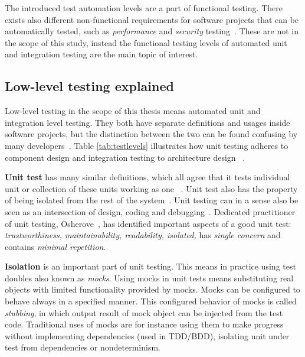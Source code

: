     The introduced test automation levels are a part of functional testing. There exists also different non-functional
    requirements for software projects that can be automatically tested, such as \textit{performance} and \textit{security} testing~\cite{crispin2009agile}.
    These are not in the scope of this study, instead the functional testing levels of automated unit and integration testing are
    the main topic of interest.

    \subsection{Low-level testing explained}
    Low-level testing in the scope of this thesis means automated unit and integration level testing. They both have separate
    definitions and usages inside software projects, but the distinction between the two can be found confusing by many developers~\cite{artofunit2013}.
    Table \ref{tab:testlevels} illustrates how unit testing adheres to component design and integration testing to architecture design ~\cite{itkonen2016}.

    \textbf{Unit test} has many similar definitions, which all agree that it tests individual unit or collection of these units working as one
    ~\cite{runeson2006survey,whittaker2000software}. Unit test also has the property of being isolated from the rest
    of the system~\cite{whittaker2000software}. Unit testing can in a sense also be seen as an intersection of design,
    coding and debugging~\cite{langr2015pragmatic}.
    Dedicated practitioner of unit testing, Osherove~\cite{artofunit2013}, has identified important aspects of a good unit test:
    \textit{trustworthiness, maintainability, readability, isolated,} has \textit{single concern} and contains \textit{minimal repetition}.

    \textbf{Isolation} is an important part of unit testing. This means in practice using test doubles also known as \textit{mocks}.
    Using mocks in unit tests means substituting real objects with limited functionality provided by mocks. Mocks can be
    configured to behave always in a specified manner. This configured behavior of mocks is called \textit{stubbing},
    in which output result of mock object can be injected from the test code. Traditional uses of mocks are for instance using
    them to make progress without implementing dependencies (used in TDD/BDD), isolating unit under test from dependencies
    or nondeterminism. ~\cite{chelimsky2010rspec}

